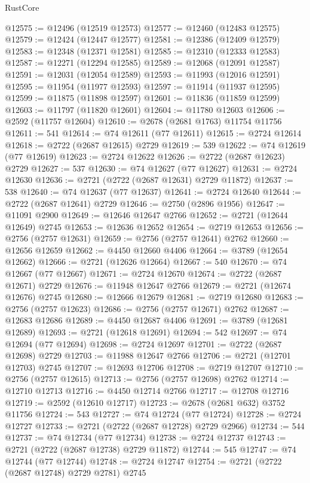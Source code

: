 \begin{lexlean}{RustCore}
\begin{coremodule}
@12575 := @12496 (@12519 @12573)
@12577 := @12460 (@12483 @12575)
@12579 := @12424 (@12447 @12577)
@12581 := @12386 (@12409 @12579)
@12583 := @12348 (@12371 @12581)
@12585 := @12310 (@12333 @12583)
@12587 := @12271 (@12294 @12585)
@12589 := @12068 (@12091 @12587)
@12591 := @12031 (@12054 @12589)
@12593 := @11993 (@12016 @12591)
@12595 := @11954 (@11977 @12593)
@12597 := @11914 (@11937 @12595)
@12599 := @11875 (@11898 @12597)
@12601 := @11836 (@11859 @12599)
@12603 := @11797 (@11820 @12601)
@12604 := @11780 @12603
@12606 := @2592 (@11757 @12604)
@12610 := @2678 (@2681 @1763) @11754 @11756
@12611 := 541
@12614 := @74 @12611 (@77 @12611)
@12615 := @2724 @12614
@12618 := @2722 (@2687 @12615) @2729
@12619 := 539
@12622 := @74 @12619 (@77 @12619)
@12623 := @2724 @12622
@12626 := @2722 (@2687 @12623) @2729
@12627 := 537
@12630 := @74 @12627 (@77 @12627)
@12631 := @2724 @12630
@12636 := @2721 (@2722 (@2687 @12631) @2729 @11872)
@12637 := 538
@12640 := @74 @12637 (@77 @12637)
@12641 := @2724 @12640
@12644 := @2722 (@2687 @12641) @2729
@12646 := @2750 (@2896 @1956)
@12647 := @11091 @2900
@12649 := @12646 @12647 @2766
@12652 := @2721 (@12644 @12649) @2745
@12653 := @12636 @12652
@12654 := @2719 @12653
@12656 := @2756 (@2757 @12631)
@12659 := @2756 (@2757 @12641) @2762
@12660 := @12656 @12659
@12662 := @4450 @12660 @4406
@12664 := @3789 (@12654 @12662)
@12666 := @2721 (@12626 @12664)
@12667 := 540
@12670 := @74 @12667 (@77 @12667)
@12671 := @2724 @12670
@12674 := @2722 (@2687 @12671) @2729
@12676 := @11948 @12647 @2766
@12679 := @2721 (@12674 @12676) @2745
@12680 := @12666 @12679
@12681 := @2719 @12680
@12683 := @2756 (@2757 @12623)
@12686 := @2756 (@2757 @12671) @2762
@12687 := @12683 @12686
@12689 := @4450 @12687 @4406
@12691 := @3789 (@12681 @12689)
@12693 := @2721 (@12618 @12691)
@12694 := 542
@12697 := @74 @12694 (@77 @12694)
@12698 := @2724 @12697
@12701 := @2722 (@2687 @12698) @2729
@12703 := @11988 @12647 @2766
@12706 := @2721 (@12701 @12703) @2745
@12707 := @12693 @12706
@12708 := @2719 @12707
@12710 := @2756 (@2757 @12615)
@12713 := @2756 (@2757 @12698) @2762
@12714 := @12710 @12713
@12716 := @4450 @12714 @2766
@12717 := @12708 @12716
@12719 := @2592 (@12610 @12717)
@12723 := @2678 (@2681 @632) @3752 @11756
@12724 := 543
@12727 := @74 @12724 (@77 @12724)
@12728 := @2724 @12727
@12733 := @2721 (@2722 (@2687 @12728) @2729 @2966)
@12734 := 544
@12737 := @74 @12734 (@77 @12734)
@12738 := @2724 @12737
@12743 := @2721 (@2722 (@2687 @12738) @2729 @11872)
@12744 := 545
@12747 := @74 @12744 (@77 @12744)
@12748 := @2724 @12747
@12754 := @2721 (@2722 (@2687 @12748) @2729 @2781) @2745

\end{coremodule}
\end{lexlean}
